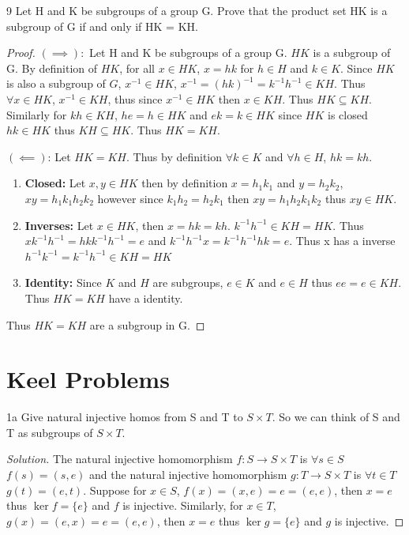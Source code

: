 \documentclass{article}
\newenvironment{solution}
{\renewcommand\qedsymbol{$\blacksquare$}\begin{proof}[Solution]}
{\end{proof}}
\begin{document}
\bigskip

\begin{PROB}{9}\label{Problem 9.}
    Let H and K be subgroups of a group G. Prove that the product set HK is a subgroup of G if and only if HK = KH.
\end{PROB}
\begin{proof}
    $(\implies):$ Let H and K be subgroups of a group G. $HK$ is a subgroup of G. By definition of $HK$, for all $x \in HK$, $x = hk$ for $h \in H$ and $k \in K$. Since $HK$ is also a subgroup of $G$, $x^{-1} \in HK$, $x^{-1} = (hk)^{-1} = k^{-1}h^{-1} \in KH$. Thus $\forall x \in HK$, $x^{-1} \in KH$, thus since $x^{-1} \in HK$ then $x \in KH$. Thus $HK \subseteq KH$. Similarly for $kh \in KH$, $he = h \in HK$ and $ek = k \in HK$ since $HK$ is closed $hk \in HK$ thus $KH \subseteq HK$. Thus $HK = KH$.

    $(\impliedby)$: Let $HK = KH$. Thus by definition $\forall k \in K$ and $\forall h \in H$, $hk = kh$.

    \begin{enumerate}
        \item \textbf{Closed: } Let $x, y \in HK$ then by definition $x = h_1k_1$ and $y = h_2k_2$, $xy = h_1k_1h_2k_2$ however since $k_1h_2 = h_2k_1$ then $xy = h_1h_2k_1k_2$ thus $xy \in HK$.
        \item \textbf{Inverses: } Let $x \in HK$, then $x = hk = kh$. $k^{-1}h^{-1} \in KH = HK$. Thus $xk^{-1}h^{-1} = hkk^{-1}h^{-1} = e$ and $k^{-1}h^{-1}x = k^{-1}h^{-1}hk = e$. Thus x has a inverse $h^{-1}k^{-1} = k^{-1}h^{-1} \in KH = HK$ 
        \item \textbf{Identity: } Since $K$ and $H$ are subgroups, $e \in K$ and $e \in H$ thus $ee = e \in KH$. Thus $HK = KH$ have a identity.
    \end{enumerate}

    Thus $HK = KH$ are a subgroup in G.
\end{proof}

\section*{Keel Problems}

\begin{PROB}{1a}\label{Problem 1a.}
    Give natural injective homos from S and T to $S\times T$.  So we can think of S and T as subgroups of $S \times T$.
\end{PROB}
\begin{solution}
    The natural injective homomorphism $f: S \to S \times T$ is $\forall s \in S$ $f(s) = (s, e)$ and the natural injective homomorphism $g: T \to S \times T$ is $\forall t \in T$ $g(t) = (e, t)$. Suppose for $x \in S$, $f(x) = (x, e) = e = (e, e)$, then $x = e$ thus $\ker f = \{e\}$ and $f$ is injective. Similarly, for $x \in T$, $g(x) = (e, x) = e = (e, e)$, then $x = e$ thus $\ker g = \{e\}$ and $g$ is injective.
\end{solution}
\end{document}
